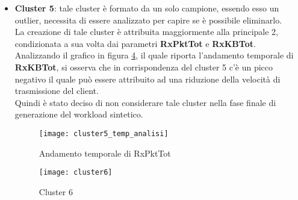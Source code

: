 \begin{itemize}
  \begin{figure}[!htbp]
    \centering
    \texttt{[image: cluster41]}
    \caption{Cluster 4.1}
    \label{cluster41}
  \end{figure}

  \begin{figure}[!htbp]
    \centering
    \texttt{[image: cluster42]}
    \caption{Cluster 4.2}
    \label{cluster42}
  \end{figure}

  \clearpage

  \begin{figure}[!htbp]
    \centering
    \texttt{[image: cluster5]}
    \caption{Cluster 5}
    \label{cluster5}
  \end{figure}

  \item \textbf{Cluster 5}: tale cluster è formato da un solo campione, essendo
  esso un outlier, necessita di essere analizzato per capire se è possibile eliminarlo.\\
  La creazione di tale cluster è attribuita maggiormente alla principale
  2, condizionata a sua volta dai parametri \textbf{RxPktTot} e \textbf{RxKBTot}.\\
  Analizzando il grafico in figura \ref{cluster5_temp_analisi}, il quale riporta
  l'andamento temporale di \textbf{RxKBTot}, si osserva che in corrispondenza del
  cluster 5 c'è un picco negativo il quale può essere attribuito ad una riduzione
  della velocità di trasmissione del client.\\
  Quindi è stato deciso di non considerare tale cluster nella fase finale di
  generazione del workload sintetico.\\

  \begin{figure}[!htbp]
    \centering
    \texttt{[image: cluster5\_temp\_analisi]}
    \caption{Andamento temporale di RxPktTot}
    \label{cluster5_temp_analisi}
  \end{figure}

  \clearpage

  \begin{figure}[!htbp]
    \centering
    \texttt{[image: cluster6]}
    \caption{Cluster 6}
    \label{cluster6}
  \end{figure}


\end{itemize}
